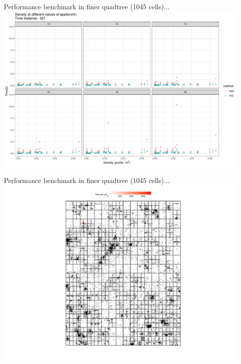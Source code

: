 \documentclass{beamer}
\begin{document}
\begin{frame}{Performance benchmark in finer quadtree (1045 cells)...}
    \centering
    \includegraphics[width=0.95\textwidth]{figures/psi_density_321}
\end{frame}


\begin{frame}{Performance benchmark in finer quadtree (1045 cells)...}
    \centering
    \includegraphics[width=0.95\textwidth]{figures/pairs_per_cell}
\end{frame}
\end{document}
